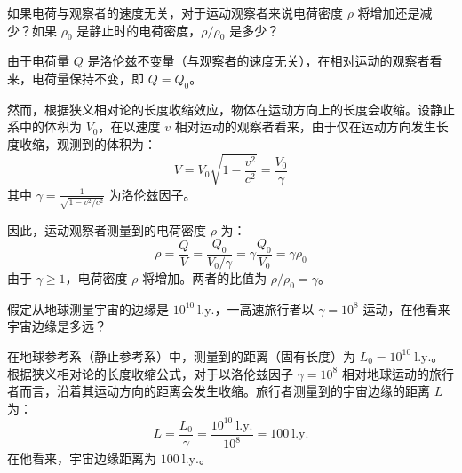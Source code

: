 \begin{exercise}\label{ex:9.1}
如果电荷与观察者的速度无关，对于运动观察者来说电荷密度 $\rho$ 将增加还是减少？如果 $\rho_0$ 是静止时的电荷密度，$\rho/\rho_0$ 是多少？
\end{exercise}
\begin{solution}
由于电荷量 $Q$ 是洛伦兹不变量（与观察者的速度无关），在相对运动的观察者看来，电荷量保持不变，即 $Q = Q_0$。

然而，根据狭义相对论的长度收缩效应，物体在运动方向上的长度会收缩。设静止系中的体积为 $V_0$，在以速度 $v$ 相对运动的观察者看来，由于仅在运动方向发生长度收缩，观测到的体积为：
$$ V = V_0 \sqrt{1 - \frac{v^2}{c^2}} = \frac{V_0}{\gamma} $$
其中 $\gamma = \frac{1}{\sqrt{1 - v^2/c^2}}$ 为洛伦兹因子。

因此，运动观察者测量到的电荷密度 $\rho$ 为：
$$ \rho = \frac{Q}{V} = \frac{Q_0}{V_0 / \gamma} = \gamma \frac{Q_0}{V_0} = \gamma \rho_0 $$
由于 $\gamma \ge 1$，电荷密度 $\rho$ 将增加。两者的比值为 $\rho/\rho_0 = \gamma$。
\end{solution}

\begin{exercise}\label{ex:9.2}
假定从地球测量宇宙的边缘是 $10^{10} \ \mathrm{l.y.}$，一高速旅行者以 $\gamma = 10^8$ 运动，在他看来宇宙边缘是多远？
\end{exercise}
\begin{solution}
在地球参考系（静止参考系）中，测量到的距离（固有长度）为 $L_0 = 10^{10} \ \mathrm{l.y.}$。
根据狭义相对论的长度收缩公式，对于以洛伦兹因子 $\gamma = 10^8$ 相对地球运动的旅行者而言，沿着其运动方向的距离会发生收缩。旅行者测量到的宇宙边缘的距离 $L$ 为：
$$ L = \frac{L_0}{\gamma} = \frac{10^{10} \ \mathrm{l.y.}}{10^8} = 100 \ \mathrm{l.y.} $$
在他看来，宇宙边缘距离为 $100 \ \mathrm{l.y.}$。
\end{solution}

